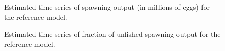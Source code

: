 \documentclass[
]{scrartcl}
\begin{document}
\begin{figure}[H]


\caption{\label{fig-spawnout}Estimated time series of spawning output
(in millions of eggs) for the reference model.}

\end{figure}%

\begin{figure}[H]


\caption{\label{fig-depl}Estimated time series of fraction of unfished
spawning output for the reference model.}

\end{figure}%
\end{document}
